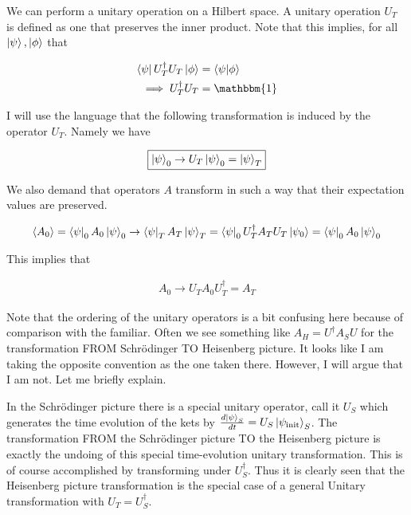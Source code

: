 \documentclass[12pt]{article}
\newcommand{\ddt}[1]{\frac{d #1}{dt}}
\begin{document}
We can perform a unitary operation on a Hilbert space. A unitary operation $U_T$ is defined as one that preserves the inner product. Note that this implies, for all $\ket{\psi}, \ket{\phi}$ that

\begin{align}
\bra{\psi}U_T^{\dag} U_T \ket{\phi} &= \braket{\psi | \phi}\\
\implies U_T^{\dag}U_T &= \mathbbm{1}
\end{align}


I will use the language that the following transformation is induced by the operator $U_T$. Namely we have

\begin{align}
\boxed{\ket{\psi}_0 \rightarrow U_T\ket{\psi}_0 = \ket{\psi}_T}
\end{align}

We also demand that operators $A$ transform in such a way that their expectation values are preserved.

\begin{align}
\braket{A_0} = \bra{\psi}_0 A_0\ket{\psi}_0 \rightarrow \bra{\psi}_T A_T \ket{\psi}_T = \bra{\psi}_0 U_T^{\dag} A_T U_T \ket{\psi_0} =  \bra{\psi}_0 A_0 \ket{\psi}_0
\end{align}

This implies that

\begin{align}
\boxed{A_0 \rightarrow U_T A_0 U_T^{\dag} = A_T}
\end{align}

Note that the ordering of the unitary operators is a bit confusing here because of comparison with the familiar. Often we see something like $A_H = U^{\dag} A_S U$ for the transformation FROM Schr{\"o}dinger TO Heisenberg picture. It looks like I am taking the opposite convention as the one taken there. However, I will argue that I am not. Let me briefly explain.

In the Schr{\"o}dinger picture there is a special unitary operator, call it $U_S$ which generates the time evolution of the kets by $\ddt{\ket{\psi}_S} = U_S \ket{\psi_{\text{init}}}_S$. The transformation FROM the Schr{\"o}dinger picture TO the Heisenberg picture is exactly the undoing of this special time-evolution unitary transformation. This is of course accomplished by transforming under $U_S^{\dag}$. Thus it is clearly seen that the Heisenberg picture transformation is the special case of a general Unitary transformation with $U_T = U_S^{\dag}$.
\end{document}
